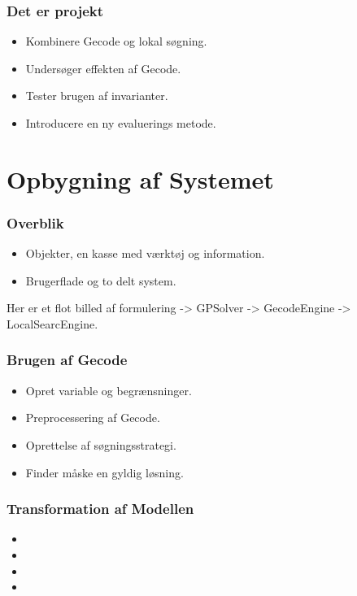 \documentclass{beamer}
\begin{document}
\begin{frame}
\frametitle{Det er projekt}
\begin{itemize}[<+->] 
\item Kombinere Gecode og lokal søgning.
\item Undersøger effekten af Gecode. 
\item Tester brugen af invarianter. 
\item Introducere en ny evaluerings metode.
\end{itemize}
\end{frame}




\section{Opbygning af Systemet}

\begin{frame}
\frametitle{Overblik}
\begin{itemize}[<+->] 
\item Objekter, en kasse med værktøj og information. 
\item Brugerflade og to delt system. 
\end{itemize}
Her er et flot billed af formulering -> GPSolver -> GecodeEngine -> LocalSearcEngine. 

\end{frame}


\begin{frame}
\frametitle{Brugen af Gecode}
\begin{itemize}[<+->]
\pause 
\item Opret variable og begrænsninger.
\item Preprocessering af Gecode.
\item Oprettelse af søgningsstrategi. 
\item Finder måske en gyldig løsning.
\end{itemize}
\end{frame}

\begin{frame}
\frametitle{Transformation af Modellen}
\begin{itemize}[<+->]
\item 
\item 
\item 
\item 
\end{itemize}
\end{frame}
\end{document}
